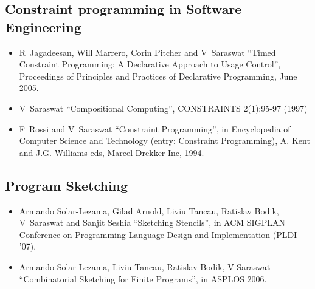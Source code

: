 \documentclass{article}
\begin{document}
\subsection*{Constraint programming in Software Engineering}
\begin{itemize} 

\item R~Jagadeesan, Will Marrero, Corin Pitcher and V~Saraswat
``Timed Constraint Programming: A Declarative Approach to Usage
Control'', Proceedings of Principles and Practices of Declarative
Programming, June 2005.

\item    V~Saraswat ``Compositional Computing'', CONSTRAINTS
    2(1):95-97 (1997)

\item F~Rossi and V~Saraswat ``Constraint Programming'',
in Encyclopedia of Computer Science and Technology (entry: Constraint
Programming), A. Kent and J.G.{} Williams eds, Marcel Drekker Inc,
1994.

\end{itemize} 

\subsection*{Program Sketching}
\begin{itemize} 

\item Armando Solar-Lezama, Gilad Arnold, Liviu Tancau, Ratislav
Bodik, V~Saraswat and Sanjit Seshia ``Sketching Stencils'', in ACM
SIGPLAN Conference on Programming Language Design and Implementation
(PLDI '07).

\item Armando Solar-Lezama, Liviu Tancau, Ratislav Bodik, V
Saraswat ``Combinatorial Sketching for Finite Programs'', in ASPLOS
2006.
\end{itemize} 
\end{document}
